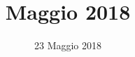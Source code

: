 


\title{ Maggio 2018}
\author{\GroupName}

\date{23 Maggio 2018}



\frenchspacing

\makeFrontPage




